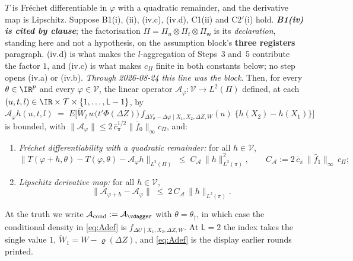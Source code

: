 \begin{proposition}\label{prp:frechet}
$T$ is Fr\'echet differentiable in $\varphi$ with a quadratic remainder, and the derivative map is
Lipschitz.
Suppose B1(i), (ii), (iv.c), (iv.d), C1(ii) and C2$'$(i) hold. \emph{\textbf{B1(iv) is cited by
clause}}; the factorisation $\Pi=\Pi_u\otimes\Pi_t\otimes\Pi_{\mathsf w}$ is its \emph{declaration},
standing here and not a hypothesis, on the assumption block's \textbf{three registers} paragraph.
\textup{(iv.d)} is what makes the $l$-aggregation of Steps~3 and~5 contribute the factor $1$, and
\textup{(iv.c)} is what makes $c_\Pi$ finite in both constants below; no step opens \textup{(iv.a)} or
\textup{(iv.b)}. \emph{Through 2026-08-24 this line was the block}. Then, for every $\theta\in\IR^{p}$ and every
$\varphi\in\mathcal V$, the linear operator $\mathcal A_\varphi:\mathcal V\to L^{2}(\Pi)$ defined, at
each $(u,t,l)\in\IR\times\mathcal T\times\{1,\dots,\mathsf L-1\}$, by
\begin{equation}\label{eq:Adef}
\mathcal A_\varphi h(u,t,l)
\;=\;E\Big[\widetilde W_l\,w\big(t'\Phi(\Delta Z)\big)\,
f_{\Delta Y_\theta-\Delta\varphi\mid X_1,X_2,\Delta Z,W}(u)\;\big\{h(X_2)-h(X_1)\big\}\Big]
\end{equation}
is bounded, with $\|\mathcal A_\varphi\|\le2\,\bar c_\pi^{1/2}\|\bar f_0\|_\infty c_\Pi$, and:
\begin{enumerate}
\item[(i)] \emph{Fr\'echet differentiability with a quadratic remainder:} for all $h\in\mathcal V$,
\begin{equation}\label{eq:frechetbound}
\big\|T(\varphi+h,\theta)-T(\varphi,\theta)-\mathcal A_\varphi h\big\|_{L^{2}(\Pi)}
\;\le\;C_{\!\mathcal A}\,\|h\|_{L^{2}(\pi)}^{2},
\qquad C_{\!\mathcal A}:=2\,\bar c_\pi\,\|\bar f_1\|_\infty\,c_\Pi ;
\end{equation}
\item[(ii)] \emph{Lipschitz derivative map:} for all $h\in\mathcal V$,
\begin{equation}\label{eq:lipschitz}
\big\|\mathcal A_{\varphi+h}-\mathcal A_\varphi\big\|\;\le\;2\,C_{\!\mathcal A}\,\|h\|_{L^{2}(\pi)} .
\end{equation}
\end{enumerate}
At the truth we write $\mathcal A_{\mathrm{cond}}:=\mathcal A_{\vdagger}$ with $\theta=\theta_\dagger$,
in which case the conditional density in \eqref{eq:Adef} is $f_{\Delta U\mid X_1,X_2,\Delta Z,W}$.
At $\mathsf L=2$ the index takes the single value $1$, $\widetilde W_1=W-\varrho(\Delta Z)$, and
\eqref{eq:Adef} is the display earlier rounds printed.
\end{proposition}

